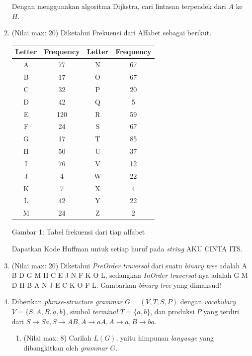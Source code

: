 \documentclass{article}
\begin{document}
\begin{enumerate}
    Dengan menggunakan algoritma Dijkstra, cari lintasan terpendek dari $A$ ke $H$.

    \item (Nilai max: 20) Diketahui Frekuensi dari Alfabet sebagai berikut.
    
    \begin{center}
        \begin{tabular}{|c|c||c|c|}
            \hline
            Letter & Frequency & Letter & Frequency \\
            \hline
            A & 77 & N & 67 \\
            B & 17 & O & 67 \\
            C & 32 & P & 20 \\
            D & 42 & Q & 5 \\
            E & 120 & R & 59 \\
            F & 24 & S & 67 \\
            G & 17 & T & 85 \\
            H & 50 & U & 37 \\
            I & 76 & V & 12 \\
            J & 4 & W & 22 \\
            K & 7 & X & 4 \\
            L & 42 & Y & 22 \\
            M & 24 & Z & 2 \\
            \hline
        \end{tabular}
    \end{center}
    
    Gambar 1: Tabel frekuensi dari tiap alfabet
    
    Dapatkan Kode Huffman untuk setiap huruf pada \textit{string} AKU CINTA ITS.

    \item (Nilai max: 20) Diketahui \textit{PreOrder traversal} dari suatu \textit{binary tree} adalah A B D G M H C E J N F K O L, sedangkan \textit{InOrder traversal}-nya adalah G M D H B A N J E C K O F L. Gambarkan \textit{binary tree} yang dimaksud!

    \item Diberikan \textit{phrase-structure grammar} $G = (V, T, S, P)$ dengan \textit{vocabulary} $V = \{S, A, B, a, b\}$, simbol \textit{terminal} $T = \{a, b\}$, dan produksi $P$ yang terdiri dari $S \rightarrow Sa, S \rightarrow AB, A \rightarrow aA, A \rightarrow a, B \rightarrow ba$.
    
    \begin{enumerate}
        \item (Nilai max: 8) Carilah $L(G)$, yaitu himpunan \textit{language} yang dibangkitkan oleh \textit{grammar} $G$.
        

\end{enumerate}
\end{enumerate}
\end{document}

